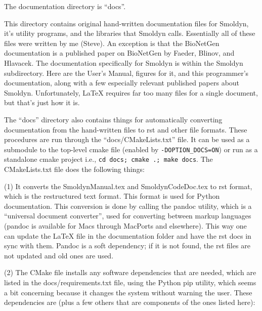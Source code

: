 \documentclass {scrbook}
\newcommand {\ttt} {\texttt}
\begin{document}
The documentation directory is ``docs''.

This directory contains original hand-written documentation files for Smoldyn, it's utility programs, and the libraries that Smoldyn calls. Essentially all of these files were written by me (Steve). An exception is that the BioNetGen documentation is a published paper on BioNetGen by Faeder, Blinov, and Hlavacek. The documentation specifically for Smoldyn is within the Smoldyn subdirectory. Here are the User's Manual, figures for it, and this programmer's documentation, along with a few especially relevant published papers about Smoldyn. Unfortunately, LaTeX requires far too many files for a single document, but that's just how it is.

The ``docs'' directory also contains things for automatically converting documentation from the hand-written files to rst and other file formats. These procedures are run through the ``docs/CMakeLists.txt'' file. It can be used as a submodule to the top-level cmake file (enabled by \ttt{-DOPTION\_DOCS=ON}) or run as a standalone cmake project i.e., \ttt{cd docs; cmake .; make docs}. The CMakeLists.txt file does the following things:

(1) It converts the SmoldynManual.tex and SmoldynCodeDoc.tex to rst format, which is the restructured text format. This format is used for Python documentation. This conversion is done by calling the pandoc utility, which is a ``universal document converter'', used for converting between markup languages (pandoc is available for Macs through MacPorts and elsewhere). This way one can update the LaTeX file in the documentation folder and have the rst docs in sync with them. Pandoc is a soft dependency; if it is not found, the rst files are not updated and old ones are used.

(2) The CMake file installs any software dependencies that are needed, which are listed in the docs/requirements.txt file, using the Python pip utility, which seems a bit concerning because it changes the system without warning the user. These dependencies are (plus a few others that are components of the ones listed here):
\end{document}
